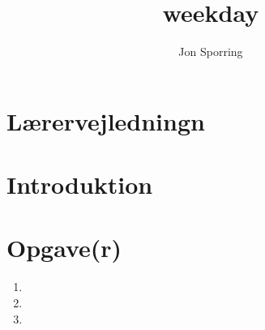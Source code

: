 \documentclass[a4paper,12pt]{article}
\title{weekday}
\author{Jon Sporring}
\begin{document}
\maketitle

\section{Lærervejledningn}

\section{Introduktion}

\section{Opgave(r)}
\begin{enumerate}
\item 
\item 
\item 
\end{enumerate}
\end{document}
